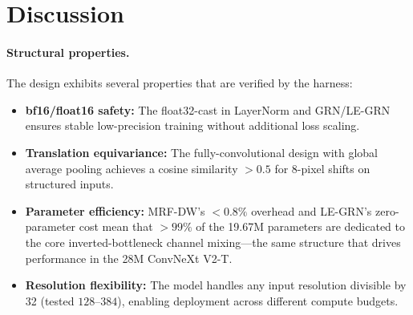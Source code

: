 \documentclass{article}
\begin{document}
\section{Discussion}
\label{sec:discussion}

\paragraph{Structural properties.}
The design exhibits several properties that are verified by the
harness:
\begin{itemize}
  \item \textbf{bf16/float16 safety:} The float32-cast in LayerNorm and
        GRN/LE-GRN ensures stable low-precision training without
        additional loss scaling.
  \item \textbf{Translation equivariance:} The fully-convolutional
        design with global average pooling achieves a cosine similarity
        $>0.5$ for 8-pixel shifts on structured inputs.
  \item \textbf{Parameter efficiency:} MRF-DW's $<0.8\%$ overhead and
        LE-GRN's zero-parameter cost mean that $>99\%$ of the 19.67M
        parameters are dedicated to the core inverted-bottleneck
        channel mixing---the same structure that drives performance in
        the 28M ConvNeXt V2-T.
  \item \textbf{Resolution flexibility:} The model handles any input
        resolution divisible by 32 (tested $128$--$384$), enabling
        deployment across different compute budgets.
\end{itemize}
\end{document}
